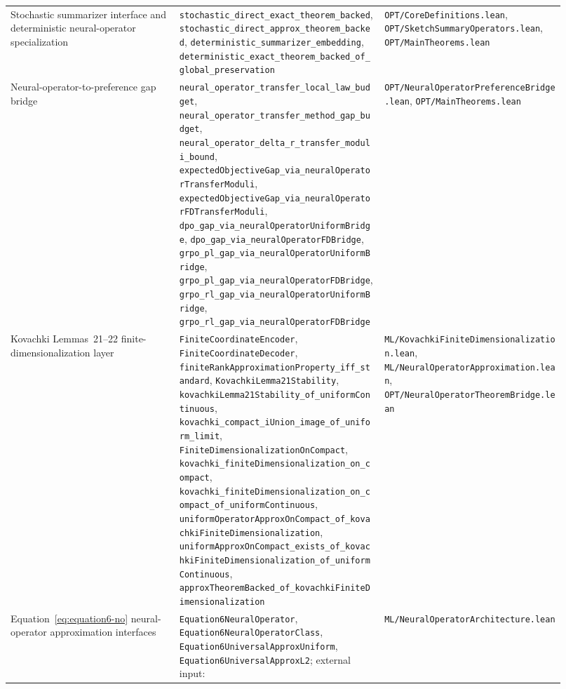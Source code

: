 {\begin{longtable}{p{0.28\linewidth}p{0.34\linewidth}p{0.30\linewidth}}
Stochastic summarizer interface and deterministic neural-operator specialization &
\texttt{stochastic\_direct\_exact\_theorem\_backed}, \texttt{stochastic\_direct\_approx\_theorem\_backed}, \texttt{deterministic\_summarizer\_embedding}, \texttt{deterministic\_exact\_theorem\_backed\_of\_global\_preservation} &
\texttt{OPT/CoreDefinitions.lean}, \texttt{OPT/SketchSummaryOperators.lean}, \texttt{OPT/MainTheorems.lean} \\

Neural-operator-to-preference gap bridge &
\texttt{neural\_operator\_transfer\_local\_law\_budget}, \texttt{neural\_operator\_transfer\_method\_gap\_budget}, \texttt{neural\_operator\_delta\_r\_transfer\_moduli\_bound}, \texttt{expectedObjectiveGap\_via\_neuralOperatorTransferModuli}, \texttt{expectedObjectiveGap\_via\_neuralOperatorFDTransferModuli}, \texttt{dpo\_gap\_via\_neuralOperatorUniformBridge}, \texttt{dpo\_gap\_via\_neuralOperatorFDBridge}, \texttt{grpo\_pl\_gap\_via\_neuralOperatorUniformBridge}, \texttt{grpo\_pl\_gap\_via\_neuralOperatorFDBridge}, \texttt{grpo\_rl\_gap\_via\_neuralOperatorUniformBridge}, \texttt{grpo\_rl\_gap\_via\_neuralOperatorFDBridge} &
\texttt{OPT/NeuralOperatorPreferenceBridge.lean}, \texttt{OPT/MainTheorems.lean} \\

Kovachki Lemmas~21--22 finite-dimensionalization layer &
\texttt{FiniteCoordinateEncoder}, \texttt{FiniteCoordinateDecoder}, \texttt{finiteRankApproximationProperty\_iff\_standard}, \texttt{KovachkiLemma21Stability}, \texttt{kovachkiLemma21Stability\_of\_uniformContinuous}, \texttt{kovachki\_compact\_iUnion\_image\_of\_uniform\_limit}, \texttt{FiniteDimensionalizationOnCompact}, \texttt{kovachki\_finiteDimensionalization\_on\_compact}, \texttt{kovachki\_finiteDimensionalization\_on\_compact\_of\_uniformContinuous}, \texttt{uniformOperatorApproxOnCompact\_of\_kovachkiFiniteDimensionalization}, \texttt{uniformApproxOnCompact\_exists\_of\_kovachkiFiniteDimensionalization\_of\_uniformContinuous}, \texttt{approxTheoremBacked\_of\_kovachkiFiniteDimensionalization} &
\texttt{ML/KovachkiFiniteDimensionalization.lean}, \texttt{ML/NeuralOperatorApproximation.lean}, \texttt{OPT/NeuralOperatorTheoremBridge.lean} \\

Equation~\eqref{eq:equation6-no} neural-operator approximation interfaces &
\texttt{Equation6NeuralOperator}, \texttt{Equation6NeuralOperatorClass}, \texttt{Equation6UniversalApproxUniform}, \texttt{Equation6UniversalApproxL2}; external input: \citet[Theorems~11,13]{Kovachki23NeuralOperator} &
\texttt{ML/NeuralOperatorArchitecture.lean} \\


\end{longtable}}
